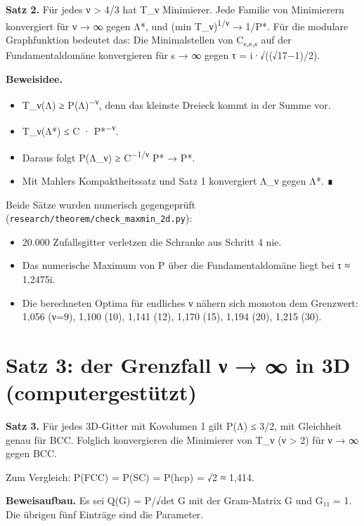 \textbf{Satz 2.} Für jedes ν \textgreater{} 4/3 hat T\_ν Minimierer. Jede Familie von Minimierern konvergiert für ν → ∞ gegen Λ*, und (min T\_ν)\textsuperscript{1/ν} → 1/P*. Für die modulare Graphfunktion bedeutet das: Die Minimalstellen von C\textsubscript{s,s,s} auf der Fundamentaldomäne konvergieren für s → ∞ gegen τ = i·√((√17−1)/2).

\textbf{Beweisidee.}

\begin{itemize}
\tightlist
\item
  T\_ν(Λ) ≥ P(Λ)\textsuperscript{−ν}, denn das kleinste Dreieck kommt in der Summe vor.
\item
  T\_ν(Λ*) ≤ C · P*\textsuperscript{−ν}.
\item
  Daraus folgt P(Λ\_ν) ≥ C\textsuperscript{−1/ν} P* → P*.
\item
  Mit Mahlers Kompaktheitssatz und Satz 1 konvergiert Λ\_ν gegen Λ*. ∎
\end{itemize}

Beide Sätze wurden numerisch gegengeprüft (\texttt{research/theorem/check\_maxmin\_2d.py}):

\begin{itemize}
\tightlist
\item
  20.000 Zufallsgitter verletzen die Schranke aus Schritt 4 nie.
\item
  Das numerische Maximum von P über die Fundamentaldomäne liegt bei τ ≈ 1,2475i.
\item
  Die berechneten Optima für endliches ν nähern sich monoton dem Grenzwert: 1,056 (ν=9), 1,100 (10), 1,141 (12), 1,170 (15), 1,194 (20), 1,215 (30).
\end{itemize}

\section{Satz 3: der Grenzfall ν → ∞ in 3D (computergestützt)}

\textbf{Satz 3.} Für jedes 3D-Gitter mit Kovolumen 1 gilt P(Λ) ≤ 3/2, mit Gleichheit genau für BCC. Folglich konvergieren die Minimierer von T\_ν (ν \textgreater{} 2) für ν → ∞ gegen BCC.

Zum Vergleich: P(FCC) = P(SC) = P(hcp) = √2 ≈ 1,414.

\textbf{Beweisaufbau.} Es sei Q(G) = P/√det G mit der Gram-Matrix G und G₁₁ = 1. Die übrigen fünf Einträge sind die Parameter.

